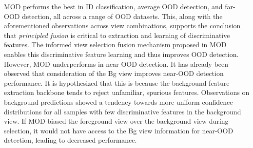 MOD performs the best in ID classification, average OOD detection, and far-OOD detection, all across a range of OOD datasets. This, along with the aforementioned observations across view combinations, supports the conclusion that \emph{principled fusion} is critical to extraction and learning of discriminative features. The informed view selection fusion mechanism proposed in MOD enables this discriminative feature learning and thus improves OOD detection. However, MOD underperforms in near-OOD detection. It has already been observed that consideration of the Bg view improves near-OOD detection performance. It is hypothesized that this is because the background feature extraction backbone tends to reject unfamiliar, spurious features. Observations on background predictions showed a tendency towards more uniform confidence distributions for all samples with few discriminative features in the background view. If MOD biased the foreground view over the background view during selection, it would not have access to the Bg view information for near-OOD detection, leading to decreased performance.
\vspace{3cm}

\begin{table}
\small
\centering
\caption{View selector performance on a curated dataset. The view selector learns to identify views with discriminative features. All numeric values are percentages except for support.
}
\label{tab:propwork-mod-results-view_selector_performance}
\end{table}

